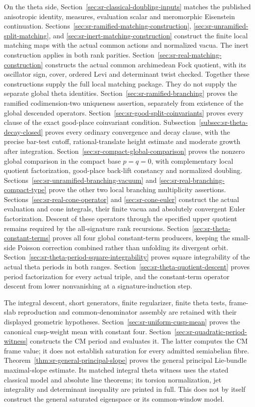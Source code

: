 On the theta side,
Section~\ref{sec:sr-classical-doubling-inputs} matches the published
anisotropic identity, measures, evaluation scalar and meromorphic
Eisenstein continuation.
Sections~\ref{sec:sr-ramified-matching-construction},
\ref{sec:sr-unramified-split-matching}, and
\ref{sec:sr-inert-matching-construction}
construct the finite local matching maps with the actual common
actions and normalized vacua.
The inert construction applies in both rank parities.
Section~\ref{sec:sr-real-matching-construction} constructs the
actual common archimedean Fock quotient, with its oscillator sign,
cover, ordered Levi and determinant twist checked.
Together these constructions supply the full local matching
package. They do not supply the separate global theta identities.
Section~\ref{sec:sr-ramified-branching} proves the ramified
codimension-two uniqueness assertion, separately from existence
of the global descended operators.
Section~\ref{sec:sr-good-split-coinvariants} proves every clause
of the exact good-place coinvariant condition.
Subsection~\ref{subsec:sr-theta-decay-closed} proves every ordinary
convergence and decay clause, with the precise bar-test cutoff,
rational-translate height estimate and moderate growth after
integration.
Section~\ref{sec:sr-compact-global-comparison} proves the
nonzero global comparison in the compact base \(p=q=0\),
with complementary local quotient factorization, good-place
back-lift constancy and normalized doubling.
Sections~\ref{sec:sr-unramified-branching-vacuum} and
\ref{sec:sr-real-branching-compact-type} prove the other two
local branching multiplicity assertions.
Sections~\ref{sec:sr-real-cone-operator} and
\ref{sec:sr-cone-euler} construct the actual evaluation and cone
integrals, their finite vacua and absolutely convergent Euler
factorization. Descent of these operators through the specified
upper quotient remains required by the all-signature rank recursions.
Section~\ref{sec:sr-theta-constant-terms} proves all four global
constant-term producers, keeping the small-side Poisson correction
combined rather than unfolding its divergent orbit.
Section~\ref{sec:sr-theta-period-square-integrability} proves
square integrability of the actual theta periods in both ranges.
Section~\ref{sec:sr-theta-quotient-descent} proves period
factorization for every actual triple, and the constant-term
operator descent from lower nonvanishing at a signature-induction
step.

The integral descent, short generators, finite regularizer,
finite theta tests, frame-slab reproduction and common-denominator
assembly are retained with their displayed geometric hypotheses.
Section~\ref{sec:sr-uniform-cusp-mean} proves the canonical
cusp-weight mean with constant four.
Section~\ref{sec:sr-quadratic-period-witness} constructs the CM
period and evaluates it.
The latter computes the CM frame value; it does not establish
saturation for every admitted semiabelian fibre.
Theorem~\ref{thm:sr-general-principal-slope} proves the general
principal Lie-bundle maximal-slope estimate. Its matched integral
theta witness uses the stated classical model and absolute line
theorems; its torsion normalization, jet integrality and determinant
inequality are printed in full. This does not by itself construct
the general saturated eigenspace or its common-window model.

